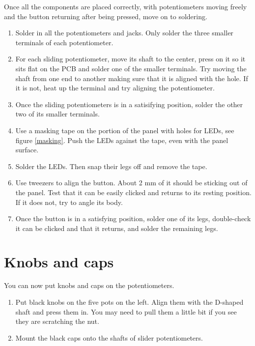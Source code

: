 \documentclass[10pt,a4paper,twocolumn]{article}
\begin{document}
\clearpage

Once all the components are placed correctly, with potentiometers moving freely
and the button returning after being pressed, move on to soldering.

\begin{enumerate}
  \item Solder in all the potentiometers and jacks. Only solder the three
    smaller terminals of each potentiometer.
  \item For each sliding potentiometer, move its shaft to the center, press on
    it so it sits flat on the PCB and solder one of the smaller terminals. Try
    moving the shaft from one end to another making sure that it is aligned with
    the hole. If it is not, heat up the terminal and try aligning the
    potentiometer.
  \item Once the sliding potentiometers is in a satisifying position, solder the
    other two of its smaller terminals.
  \item Use a masking tape on the portion of the panel with holes for LEDs, see
    figure \ref{masking}. Push the LEDs against the tape, even with the panel
    surface.
  \item Solder the LEDs. Then snap their legs off and remove the tape.
  \item Use tweezers to align the button. About 2 mm of it should be
    sticking out of the panel. Test that it can be easily clicked and
    returns to its resting position. If it does not, try to angle its body.
  \item Once the button is in a satisfying position, solder one of its legs,
    double-check it can be clicked and that it returns, and solder the remaining
    legs.
\end{enumerate}

\section{Knobs and caps}

You can now put knobs and caps on the potentiometers.

\begin{enumerate}
  \item Put black knobs on the five pots on the left. Align them with the
    D-shaped shaft and press them in. You may need to pull them a little bit if
    you see they are scratching the nut.
  \item Mount the black caps onto the shafts of slider potentiometers.
\end{enumerate}
\end{document}
